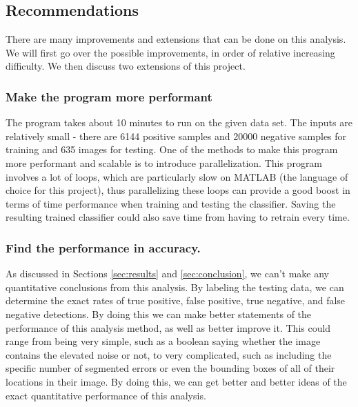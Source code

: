 \documentclass[twocolumn,longauthor]{aastex61}
\begin{document}
\subsection{Recommendations} \label{subsec:recs}
\noindent There are many improvements and extensions that can be done on this analysis. We will first go over the possible improvements, in order of relative increasing difficulty. We then discuss two extensions of this project.\\

\subsubsection{Make the program more performant} \label{subsubsec:performance}
\noindent The program takes about 10 minutes to run on the given data set. The inputs are relatively small - there are 6144 positive samples and 20000 negative samples for training and 635 images for testing. One of the methods to make this program more performant and scalable is to introduce parallelization. This program involves a lot of loops, which are particularly slow on MATLAB (the language of choice for this project), thus parallelizing these loops can provide a good boost in terms of time performance when training and testing the classifier. Saving the resulting trained classifier could also save time from having to retrain every time.

\subsubsection{Find the performance in accuracy.} \label{subsubsec:accuracy}
\noindent As discussed in Sections \ref{sec:results} and \ref{sec:conclusion}, we can't make any quantitative conclusions from this analysis. By labeling the testing data, we can determine the exact rates of true positive, false positive, true negative, and false negative detections. By doing this we can make better statements of the performance of this analysis method, as well as better improve it. This could range from being very simple, such as a boolean saying whether the image contains the elevated noise or not, to very complicated, such as including the specific number of segmented errors or even the bounding boxes of all of their locations in their image. By doing this, we can get better and better ideas of the exact quantitative performance of this analysis.
\end{document}
